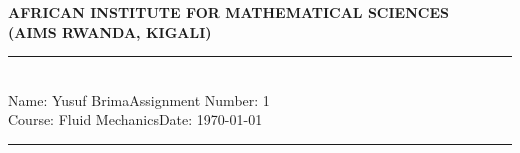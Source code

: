 \documentclass[12pt,a4paper]{article}
\newcommand{\student}{Yusuf Brima}
\newcommand{\course}{Fluid Mechanics}
\newcommand{\assignment}{1}
\begin{document}
\thispagestyle{empty}
\begin{center}
\textbf{AFRICAN INSTITUTE FOR MATHEMATICAL SCIENCES \\[0.5cm]
(AIMS RWANDA, KIGALI)}
\vspace{1.0cm}
\end{center}

\noindent
\rule{17cm}{0.2cm}\\[0.3cm]
Name: \student \hfill Assignment Number: \assignment\\[0.1cm]
Course: \course \hfill Date: \today\\
\rule{17cm}{0.05cm}
\vspace{1.0cm}
\end{document}
